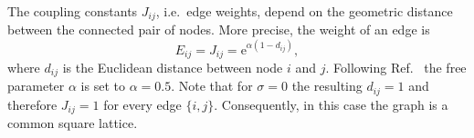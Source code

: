     The coupling constants \(J_{ij}\), i.e.~edge weights, depend on the
    geometric distance between the connected pair of nodes. More precise,
    the weight of an edge is
    \begin{equation}
        E_{ij} = J_{ij} = \mathrm{e}^{\alpha (1-d_{ij})},
        \label{eq:coupling}
    \end{equation}
    where \(d_{ij}\) is the Euclidean
    distance between node \(i\) and \(j\). Following Ref.~\cite{Lima2000}
    the free parameter \(\alpha\) is set to \(\alpha = 0.5\).
    Note that for \(\sigma = 0\) the resulting \(d_{ij} = 1\) and therefore
    \(J_{ij} = 1\) for every edge $\{i,j\}$. Consequently, in this case
    the graph is a common square lattice.
